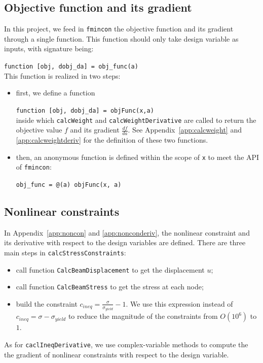 \documentclass[a4paper]{article}
\begin{document}
\subsection{Objective function and its gradient}\label{sec:obj}
In this project, we feed in \texttt{fmincon} the objective function and its gradient through a single function. This function should only take design variable as inputs, with signature being:

  \hspace{10 mm}\texttt{function [obj, dobj\_da] = obj\_func(a)}\\
This function is realized in two steps:
\begin{itemize}
  \item first, we define a function
  
  \hspace{10 mm}\texttt{function [obj, dobj\_da] = objFunc(x,a)}\\
  inside which \texttt{calcWeight} and \texttt{calcWeightDerivative} are called to return the objective value $f$ and its gradient $\frac{df}{da}$. See Appendix~\ref{app:calcweight} and \ref{app:calcweightderiv} for the definition of these two functions.
  \item then, an anonymous function is defined within the scope of \texttt{x} to meet the API of \texttt{fmincon}:
  
  \hspace{10 mm}\texttt{obj\_func = @(a) objFunc(x, a)}
  
\end{itemize}

\subsection{Nonlinear constraints}
In Appendix~\ref{app:noncon} and \ref{app:nonconderiv}, the nonlinear constraint and its derivative with respect to the design variables are defined. There are three main steps in \texttt{calcStressConstraints}:
\begin{itemize}
  \item call function \texttt{CalcBeamDisplacement} to get the displacement $u$;
  \item call function \texttt{CalcBeamStress} to get the stress at each node;
  \item build the constraint $c_{ineq} = \frac{\sigma}{\sigma_{yield}}-1$. We use this expression instead of $c_{ineq} = \sigma - \sigma_{yield}$ to reduce the magnitude of the constraints from $O(10^6)$ to $1$. 
\end{itemize}
As for \texttt{caclIneqDerivative}, we use complex-variable methods to compute the the gradient of nonlinear constraints with respect to the design variable.  
\end{document}
